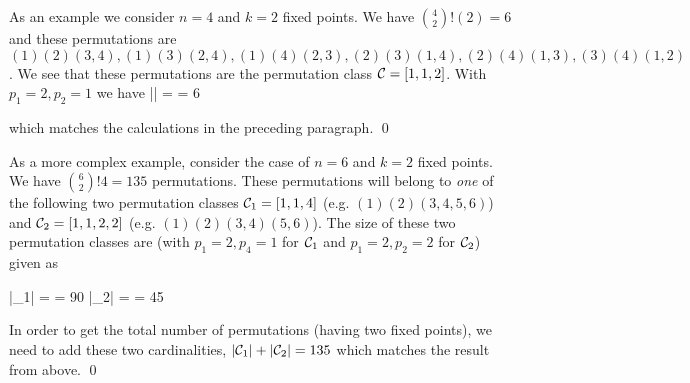 As an example we consider $n=4$ and $k=2$ fixed points. We have ${4 \choose 2} !(2) = 6$ and these permutations are $(1)(2)(3,4), (1)(3)(2,4), (1)(4)(2,3), (2)(3)(1,4), (2)(4)(1,3), (3)(4)(1,2)$. We see that these permutations are the permutation class $\mathcal{C} = [1,1,2]$. With $p_1=2, p_2=1$ we have
\bee
|\Cc| =  = 6
\eee

which matches the calculations in the preceding paragraph. \qed

As a more complex example, consider the case of $n=6$ and $k=2$ fixed points. We have ${6 \choose 2} !4 = 135$ permutations. These permutations will belong to \emph{one} of the following two permutation classes $\mathcal{C}_1 = [1,1,4]$ (e.g. $(1)(2)(3,4,5,6)$) and $\mathcal{C}_2 = [1,1,2,2]$ (e.g. $(1)(2)(3,4)(5,6)$).
The size of these two permutation classes are (with $p_1=2, p_4=1$ for $\mathcal{C}_1$ and $p_1=2, p_2=2$ for $\mathcal{C}_2$) given as

\bee
|\Cc_1| =  = 90 \quad |\Cc_2| =  = 45
\eee

In order to get the total number of permutations (having two fixed points), we need to add these two cardinalities, $|\mathcal{C}_1| + |\mathcal{C}_2| = 135$ which matches the result from above. \qed


